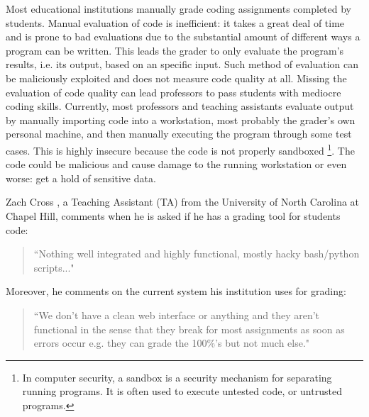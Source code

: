 

Most educational institutions manually grade coding assignments completed by
students. Manual evaluation of code is inefficient: it takes a great deal of
time and is prone to bad evaluations due to the substantial amount of different
ways a program can be written. This leads the grader to only evaluate the
program's results, i.e. its output, based on an specific input. Such
method of evaluation can be maliciously exploited and does not measure code
quality at all. Missing the evaluation of code quality can lead professors to pass
students with mediocre coding skills. Currently, most professors and teaching
assistants evaluate output by manually importing code into a workstation, most
probably the grader's own personal machine, and then manually executing the
program through some test cases. This is highly insecure because the code
is not properly sandboxed \footnote{In computer security, a sandbox is a
security mechanism for separating running programs. It is often used to execute
untested code, or untrusted programs.}. The code could be malicious and cause
damage to the running workstation or even worse: get a hold of sensitive data.


Zach Cross \cite{Zach}, a Teaching Assistant (TA) from the University of North Carolina at
Chapel Hill, comments when he is asked if he has a grading tool for students
code: \begin{quote} ``Nothing well integrated and highly functional, mostly hacky
bash/python scripts..." \end{quote} Moreover, he comments on the current system
his institution uses for grading: \begin{quote} ``We don't have a clean web
interface or anything and they aren't functional in the sense that they break
for most assignments as soon as errors occur e.g. they can grade the 100\%'s but
not much else." \end{quote}

